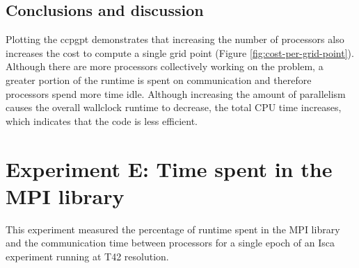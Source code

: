 \documentclass[a4paper,11pt]{report}
\begin{document}
\subsection{Conclusions and discussion}
Plotting the \gls{ccpgpt} demonstrates that increasing the number of processors also increases the cost to compute a single grid point (Figure \ref{fig:cost-per-grid-point}). Although there are more processors collectively working on the problem, a greater portion of the runtime is spent on communication and therefore processors spend more time idle. Although increasing the amount of parallelism causes the overall wallclock runtime to decrease, the total CPU time increases, which indicates that the code is less efficient. 

\section{Experiment E: Time spent in the MPI library}
\label{sec:mpi-comms}
This experiment measured the percentage of runtime spent in the MPI library and the communication time between processors for a single epoch of an Isca experiment running at T42 resolution.
\end{document}
